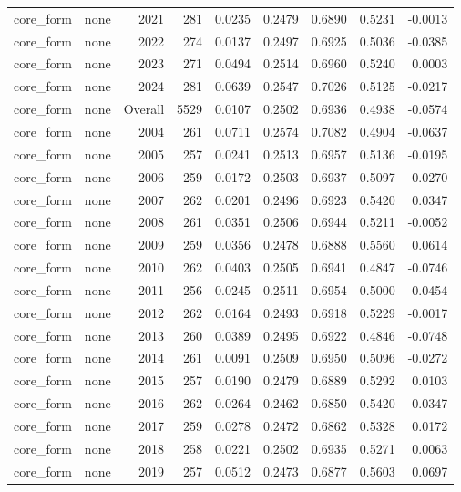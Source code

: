 \begin{table}[t]
\begin{tabular}{@{} l l r r r r r r r @{} }
      core\_form & none & 2021 & 281 & 0.0235 & 0.2479 & 0.6890 & 0.5231 & -0.0013 \\
      core\_form & none & 2022 & 274 & 0.0137 & 0.2497 & 0.6925 & 0.5036 & -0.0385 \\
      core\_form & none & 2023 & 271 & 0.0494 & 0.2514 & 0.6960 & 0.5240 & 0.0003 \\
      core\_form & none & 2024 & 281 & 0.0639 & 0.2547 & 0.7026 & 0.5125 & -0.0217 \\
      core\_form & none & Overall & 5529 & 0.0107 & 0.2502 & 0.6936 & 0.4938 & -0.0574 \\
      core\_form & none & 2004 & 261 & 0.0711 & 0.2574 & 0.7082 & 0.4904 & -0.0637 \\
      core\_form & none & 2005 & 257 & 0.0241 & 0.2513 & 0.6957 & 0.5136 & -0.0195 \\
      core\_form & none & 2006 & 259 & 0.0172 & 0.2503 & 0.6937 & 0.5097 & -0.0270 \\
      core\_form & none & 2007 & 262 & 0.0201 & 0.2496 & 0.6923 & 0.5420 & 0.0347 \\
      core\_form & none & 2008 & 261 & 0.0351 & 0.2506 & 0.6944 & 0.5211 & -0.0052 \\
      core\_form & none & 2009 & 259 & 0.0356 & 0.2478 & 0.6888 & 0.5560 & 0.0614 \\
      core\_form & none & 2010 & 262 & 0.0403 & 0.2505 & 0.6941 & 0.4847 & -0.0746 \\
      core\_form & none & 2011 & 256 & 0.0245 & 0.2511 & 0.6954 & 0.5000 & -0.0454 \\
      core\_form & none & 2012 & 262 & 0.0164 & 0.2493 & 0.6918 & 0.5229 & -0.0017 \\
      core\_form & none & 2013 & 260 & 0.0389 & 0.2495 & 0.6922 & 0.4846 & -0.0748 \\
      core\_form & none & 2014 & 261 & 0.0091 & 0.2509 & 0.6950 & 0.5096 & -0.0272 \\
      core\_form & none & 2015 & 257 & 0.0190 & 0.2479 & 0.6889 & 0.5292 & 0.0103 \\
      core\_form & none & 2016 & 262 & 0.0264 & 0.2462 & 0.6850 & 0.5420 & 0.0347 \\
      core\_form & none & 2017 & 259 & 0.0278 & 0.2472 & 0.6862 & 0.5328 & 0.0172 \\
      core\_form & none & 2018 & 258 & 0.0221 & 0.2502 & 0.6935 & 0.5271 & 0.0063 \\
      core\_form & none & 2019 & 257 & 0.0512 & 0.2473 & 0.6877 & 0.5603 & 0.0697 \\

\end{tabular}
\end{table}
